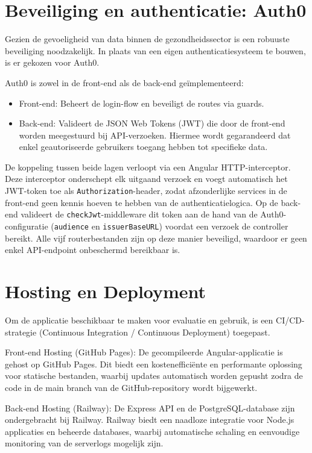 \section{Beveiliging en authenticatie: Auth0}
\label{sec:auth0}

Gezien de gevoeligheid van data binnen de gezondheidssector is een robuuste beveiliging noodzakelijk. 
In plaats van een eigen authenticatiesysteem te bouwen, is er gekozen voor Auth0.
\medskip

Auth0 is zowel in de front-end als de back-end geïmplementeerd:
 
\begin{itemize}
    \item Front-end: Beheert de login-flow en beveiligt de routes via guards.
    \item Back-end: Valideert de JSON Web Tokens (JWT) die door de front-end worden meegestuurd bij API-verzoeken. Hiermee wordt gegarandeerd dat enkel geautoriseerde gebruikers toegang hebben tot specifieke data.
\end{itemize}
 
De koppeling tussen beide lagen verloopt via een Angular HTTP-interceptor.
Deze interceptor onderschept elk uitgaand verzoek en voegt automatisch het JWT-token toe als \texttt{Authorization}-header, zodat afzonderlijke services in de front-end geen kennis hoeven te hebben van de authenticatielogica.
Op de back-end valideert de \texttt{checkJwt}-middleware dit token aan de hand van de Auth0-configuratie (\texttt{audience} en \texttt{issuerBaseURL}) voordat een verzoek de controller bereikt.
Alle vijf routerbestanden zijn op deze manier beveiligd, waardoor er geen enkel API-endpoint onbeschermd bereikbaar is.

\section{Hosting en Deployment}
\label{hosting}

Om de applicatie beschikbaar te maken voor evaluatie en gebruik, is een CI/CD-strategie (Continuous Integration / Continuous Deployment) toegepast.
\medskip

Front-end Hosting (GitHub Pages): De gecompileerde Angular-applicatie is gehost op GitHub Pages. 
Dit biedt een kostenefficiënte en performante oplossing voor statische bestanden, waarbij updates automatisch worden gepusht zodra de code in de main branch van de GitHub-repository wordt bijgewerkt.
\medskip

Back-end Hosting (Railway): De Express API en de PostgreSQL-database zijn ondergebracht bij Railway. 
Railway biedt een naadloze integratie voor Node.js applicaties en beheerde databases, waarbij automatische schaling en eenvoudige monitoring van de serverlogs mogelijk zijn.